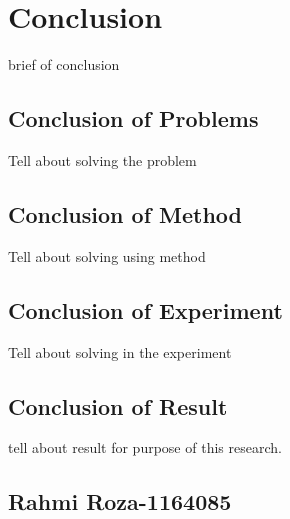 \chapter{Conclusion}
brief of conclusion

\section{Conclusion of Problems}
Tell about solving the problem

\section{Conclusion of Method}
Tell about solving using method

\section{Conclusion of Experiment}
Tell about solving in the experiment

\section{Conclusion of Result}
tell about result for purpose of this research.



\section{Rahmi Roza-1164085}
